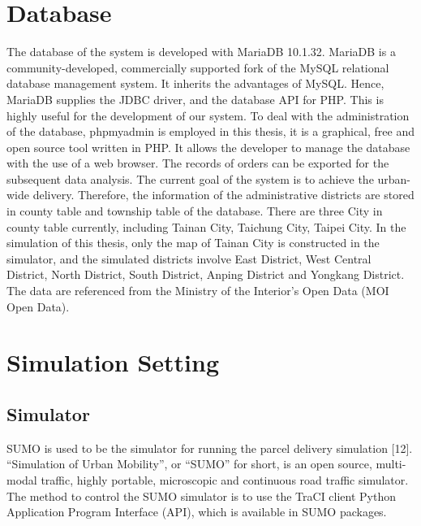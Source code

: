 \documentclass[12pt]{ksthesis}
\begin{document}
\begin{thesis}
{\section{Database}
The database of the system is developed with MariaDB 10.1.32. MariaDB is a community-developed, commercially supported fork of the MySQL relational database management system. It inherits the advantages of MySQL. Hence, MariaDB supplies the JDBC driver, and the database API for PHP. This is highly useful for the development of our system. To deal with the administration of the database, phpmyadmin is employed in this thesis, it is a graphical, free and open source tool written in PHP. It allows the developer to manage the database with the use of a web browser. The records of orders can be exported for the subsequent data analysis.
The current goal of the system is to  achieve the urban-wide delivery. Therefore, the information of the administrative districts are stored in county table and township table of the database. There are three City in county table currently, including Tainan City, Taichung City, Taipei City. In the simulation of this thesis, only the map of Tainan City is constructed in the simulator, and the simulated districts involve East District, West Central District, North District, South District, Anping District and Yongkang District. The data are referenced from the Ministry of the Interior’s Open Data (MOI Open Data).










\section{Simulation Setting}

\subsection{Simulator}
SUMO is used to be the simulator for running the parcel delivery simulation [12]. “Simulation of Urban Mobility”, or “SUMO” for short, is an open source, multi-modal traffic, highly portable, microscopic and continuous road traffic simulator. The method to control the SUMO simulator is to use the TraCI client Python Application Program Interface (API), which is available in SUMO packages.

}
\end{thesis}
\end{document}
